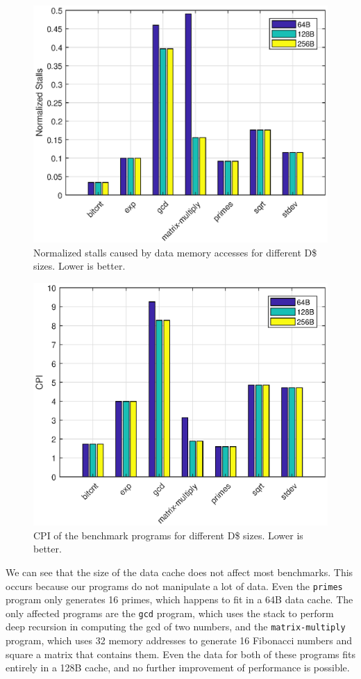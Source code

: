 \documentclass[conference, hidelinks]{IEEEtran}
\begin{document}
\begin{figure}[!htb]
  \centering
  \includegraphics[width=0.775\columnwidth]{plots/data_cache_stalls.eps}
  \caption{Normalized stalls caused by data memory accesses for different D\$ sizes. Lower is better.}
  \label{fig:data_cache_stalls}
\end{figure}

\begin{figure}[!htb]
  \centering
  \includegraphics[width=0.775\columnwidth]{plots/data_cache_cpi.eps}
  \caption{CPI of the benchmark programs for different D\$ sizes. Lower is better.}
  \label{fig:data_cache_cpi}
\end{figure}

We can see that the size of the data cache does not affect most benchmarks. This occurs because our programs do not manipulate a lot of data. Even the \texttt{primes} program only generates 16 primes, which happens to fit in a 64B data cache. The only affected programs are the \texttt{gcd} program, which uses the stack to perform deep recursion in computing the gcd of two numbers, and the \texttt{matrix-multiply} program, which uses 32 memory addresses to generate 16 Fibonacci numbers and square a matrix that contains them. Even the data for both of these programs fits entirely in a 128B cache, and no further improvement of performance is possible.
\end{document}
